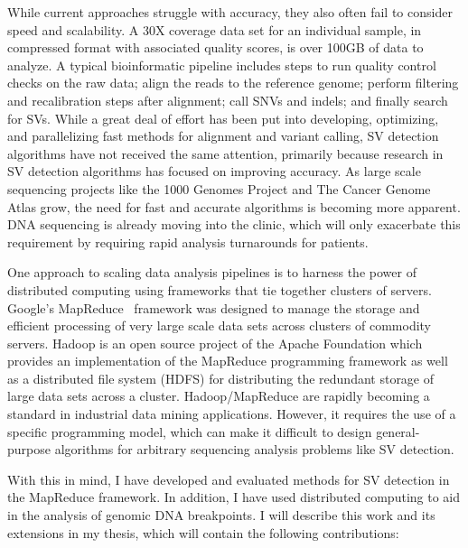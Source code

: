\documentclass [11pt] {report}
\begin{document}
While current approaches struggle with accuracy, they also often fail to consider speed and scalability. A 30X coverage data set for an individual sample, in compressed format with associated quality scores, is over 100GB of data to analyze. A typical bioinformatic pipeline includes steps to run quality control checks on the raw data; align the reads to the reference genome; perform filtering and recalibration steps after alignment; call SNVs and indels; and finally search for SVs. While a great deal of effort has been put into developing, optimizing, and parallelizing fast methods for alignment and variant calling, SV detection algorithms have not received the same attention, primarily because research in SV detection algorithms has focused on improving accuracy. As large scale sequencing projects like the 1000 Genomes Project and The Cancer Genome Atlas grow, the need for fast and accurate algorithms is becoming more apparent. DNA sequencing is already moving into the clinic, which will only exacerbate this requirement by requiring rapid analysis turnarounds for patients.

One approach to scaling data analysis pipelines is to harness the power of distributed computing using frameworks that tie together clusters of servers. Google's MapReduce~\cite{Dean:2008p277} framework was designed to manage the storage and efficient processing of very large scale data sets across clusters of commodity servers. Hadoop is an open source project of the Apache Foundation which provides an implementation of the MapReduce programming framework as well as a distributed file system (HDFS) for distributing the redundant storage of large data sets across a cluster. Hadoop/MapReduce are rapidly becoming a standard in industrial data mining applications. However, it requires the use of a specific programming model, which can make it difficult to design general-purpose algorithms for arbitrary sequencing analysis problems like SV detection. 

With this in mind, I have developed and evaluated methods for SV detection in the MapReduce framework. In addition, I have used distributed computing to aid in the analysis of genomic DNA breakpoints. I will describe this work and its extensions in my thesis, which will contain the following contributions:
\end{document}
